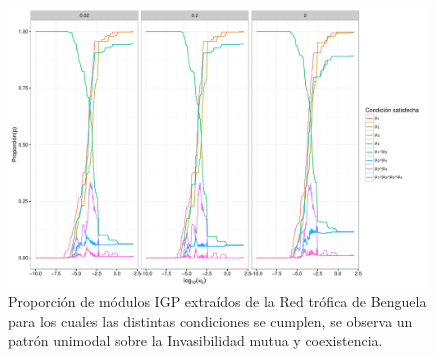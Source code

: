 \begin{figure}
  \centering
  \includegraphics[width = 0.99\textwidth]{./Plots/DataAna.pdf}
  \caption[Empirica]{Proporci\'on de m\'odulos IGP extra\'idos de la Red tr\'ofica de Benguela para los cuales las distintas condiciones se cumplen, se observa un patr\'on unimodal sobre la Invasibilidad mutua y coexistencia.}
  \label{fig:DataAna}
\end{figure}






